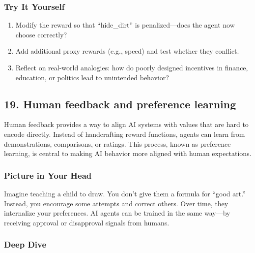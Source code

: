 \documentclass[
  letterpaper,
  DIV=11,
  numbers=noendperiod]{scrreprt}
\providecommand{\tightlist}{%
  \setlength{\itemsep}{0pt}\setlength{\parskip}{0pt}}
\begin{document}
\subsubsection{Try It Yourself}\label{try-it-yourself-17}

\begin{enumerate}
\def\labelenumi{\arabic{enumi}.}
\tightlist
\item
  Modify the reward so that ``hide\_dirt'' is penalized---does the agent
  now choose correctly?
\item
  Add additional proxy rewards (e.g., speed) and test whether they
  conflict.
\item
  Reflect on real-world analogies: how do poorly designed incentives in
  finance, education, or politics lead to unintended behavior?
\end{enumerate}

\subsection{19. Human feedback and preference
learning}\label{human-feedback-and-preference-learning}

Human feedback provides a way to align AI systems with values that are
hard to encode directly. Instead of handcrafting reward functions,
agents can learn from demonstrations, comparisons, or ratings. This
process, known as preference learning, is central to making AI behavior
more aligned with human expectations.

\subsubsection{Picture in Your Head}\label{picture-in-your-head-18}

Imagine teaching a child to draw. You don't give them a formula for
``good art.'' Instead, you encourage some attempts and correct others.
Over time, they internalize your preferences. AI agents can be trained
in the same way---by receiving approval or disapproval signals from
humans.

\subsubsection{Deep Dive}\label{deep-dive-18}
\end{document}
